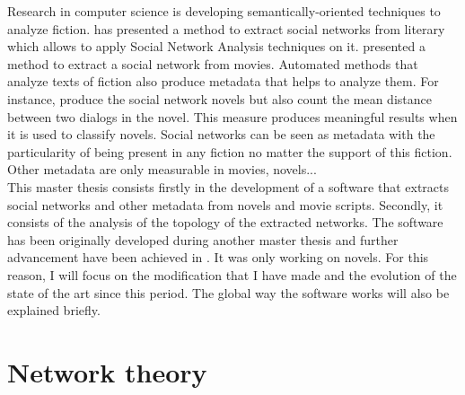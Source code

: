 \documentclass[a4paper, 12pt]{report}
\begin{document}
Research in computer science is developing semantically-oriented techniques to analyze fiction. \cite{character_country} has presented a method to extract social networks from literary which allows to apply Social Network Analysis techniques on it. \cite{movie} presented a method to extract a social network from movies. Automated methods that analyze texts of fiction also produce metadata that helps to analyze them. For instance, \cite{original} produce the social network novels but also count the mean distance between two dialogs in the novel. This measure produces meaningful results when it is used to classify novels. Social networks can be seen as metadata with the particularity of being present in any fiction no matter the support of this fiction. Other metadata are only measurable in movies, novels... \\

This master thesis consists firstly in the development of a software that extracts social networks and other metadata from novels and movie scripts. Secondly, it consists of the analysis of the topology of the extracted networks. The software has been originally developed during another master thesis \citep{original_thesis} and further advancement have been achieved in \cite{original}. It was only working on novels. For this reason, I will focus on the modification that I have made and the evolution of the state of the art since this period. The global way the software works will also be explained briefly. \\


\chapter{Network theory}
\begin{table}
\center
{}
\caption{Example of social networks \citep{SNA_Overview}}\label{SNA_Exemple}
\end{table}
\end{document}
